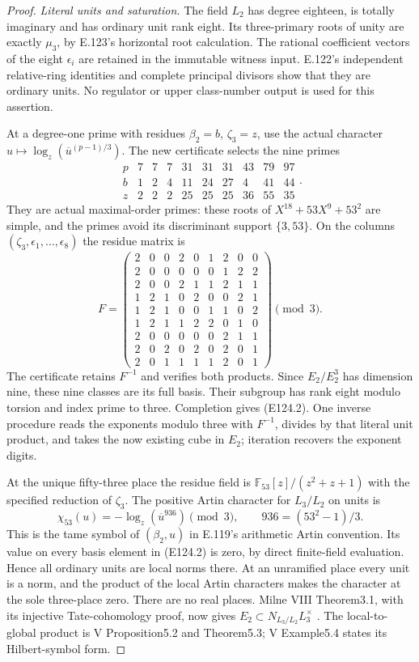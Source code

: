 \begin{proof}
\emph{Literal units and saturation.}
The field $L_2$ has degree eighteen, is totally imaginary and
has ordinary unit rank eight. Its three-primary roots of unity
are exactly $\mu_3$, by E.123's horizontal root calculation.
The rational coefficient vectors of the eight $\epsilon_i$
are retained in the immutable witness input. E.122's independent
relative-ring identities and complete principal divisors show
that they are ordinary units. No regulator or upper class-number
output is used for this assertion.

At a degree-one prime with residues $\beta_2=b$, $\zeta_3=z$,
use the actual character $u\mapsto\log_z(\overline u^{(p-1)/3})$.
The new certificate selects the nine primes
\[
 \begin{array}{c|rrrrrrrrr}
 p&7&7&7&31&31&31&43&79&97\\
 b&1&2&4&11&24&27&4&41&44\\
 z&2&2&2&25&25&25&36&55&35
 \end{array}.
 \tag{E124.11}
\]
They are actual maximal-order primes: these roots of
$X^{18}+53X^9+53^2$ are simple, and the primes avoid its
discriminant support $\{3,53\}$. On the columns
$(\zeta_3,\epsilon_1,\ldots,\epsilon_8)$ the residue matrix is
\[
 F=\begin{pmatrix}
 2&0&0&2&0&1&2&0&0\\
 2&0&0&0&0&0&1&2&2\\
 2&0&0&2&1&1&2&1&1\\
 1&2&1&0&2&0&0&2&1\\
 1&2&1&0&0&1&1&0&2\\
 1&2&1&1&2&2&0&1&0\\
 2&0&0&0&0&0&2&1&1\\
 2&0&2&0&2&0&2&0&1\\
 2&0&1&1&1&1&2&0&1
 \end{pmatrix}\pmod3.
 \tag{E124.12}
\]
The certificate retains $F^{-1}$ and verifies both products.
Since $E_2/E_2^3$ has dimension nine, these nine classes are
its full basis. Their subgroup has rank eight modulo torsion
and index prime to three. Completion gives (E124.2).
One inverse procedure reads the exponents modulo three with
$F^{-1}$, divides by that literal unit product, and takes the
now existing cube in $E_2$; iteration recovers the exponent digits.

At the unique fifty-three place the residue field is
$\mathbb F_{53}[z]/(z^2+z+1)$ with the specified reduction of
$\zeta_3$. The positive Artin character for $L_3/L_2$ on units is
\[
 \chi_{53}(u)=-\log_z(\overline u^{936})\pmod3,\qquad
 936=(53^2-1)/3.
 \tag{E124.13}
\]
This is the tame symbol of $(\beta_2,u)$ in E.119's arithmetic
Artin convention. Its value on every basis element in
(E124.2) is zero, by direct finite-field evaluation. Hence all
ordinary units are local norms there. At an unramified place
every unit is a norm, and the product of the local Artin
characters makes the character at the sole three-place zero.
There are no real places. Milne VIII Theorem3.1, with its
injective Tate-cohomology proof, now gives
$E_2\subset N_{L_3/L_2}L_3^\times$ \cite{E_MilneCFT}.
The local-to-global product is V Proposition5.2 and
Theorem5.3; V Example5.4 states its Hilbert-symbol form.


\end{proof}
